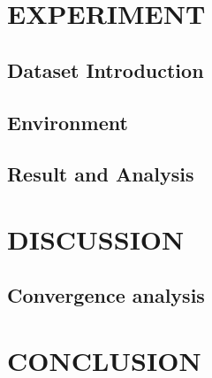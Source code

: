 \documentclass{article}
\begin{document}
	\section{EXPERIMENT}\label{sec:experiment}

	\subsection{Dataset Introduction}\label{subsec:dataset-introduction}

	\subsection{Environment}\label{subsec:environment}

	\subsection{Result and Analysis}\label{subsec:result-and-analysis}


	\section{DISCUSSION}\label{sec:discussion}

	\subsection{Convergence analysis}\label{subsec:convergence}


	\section{CONCLUSION}\label{sec:conclusion}


	
\end{document}
